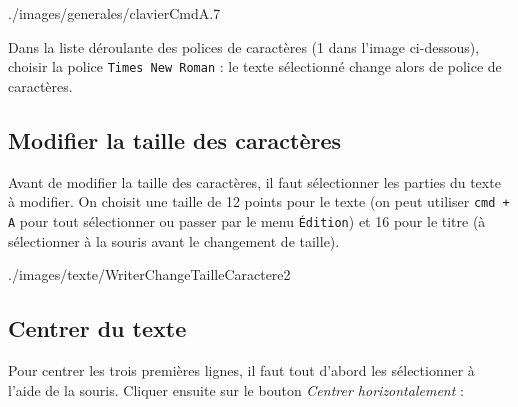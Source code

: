               {./images/generales/clavierCmdA}{.7\textwidth}

Dans la liste déroulante des polices de caractères (1 dans l'image ci-dessous), choisir la police \texttt{Times New Roman} : le texte sélectionné change alors de police de caractères.  




\subsection{Modifier la taille des caractères} 

Avant de modifier la taille des caractères, il faut sélectionner les parties du texte à modifier. On choisit une taille de 12 points pour le texte (on peut utiliser \texttt{cmd + A} pour tout sélectionner ou passer par le menu \texttt{Édition}) et 16 pour le titre (à sélectionner à la souris avant le changement de taille).

%
              {./images/texte/WriterChangeTailleCaractere2}{\textwidth}







\subsection{Centrer du texte}

Pour centrer les trois premières lignes, il faut tout d'abord les sélectionner à l'aide de la souris. Cliquer ensuite sur le bouton \emph{Centrer horizontalement} : 


%
%
%




